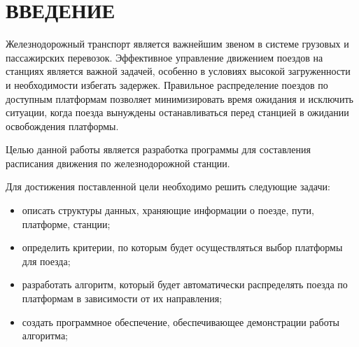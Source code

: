 \section*{\centering ВВЕДЕНИЕ}

Железнодорожный транспорт является важнейшим звеном в системе грузовых и пассажирских перевозок.
Эффективное управление движением поездов на станциях является важной задачей, особенно в условиях высокой загруженности и необходимости избегать задержек.
Правильное распределение поездов по доступным платформам позволяет минимизировать время ожидания и исключить ситуации, когда поезда вынуждены останавливаться перед станцией в ожидании освобождения платформы.

Целью данной работы является разработка программы для составления расписания движения по железнодорожной станции.

Для достижения поставленной цели необходимо решить следующие задачи:
\begin{itemize}
	\item описать структуры данных, храняющие информации о поезде, пути, платформе, станции;
	\item определить критерии, по которым будет осуществляться выбор платформы для поезда;
	\item разработать алгоритм, который будет автоматически распределять поезда по платформам в зависимости от их направления;
	\item создать программное обеспечение, обеспечивающее демонстрации работы алгоритма;
\end{itemize}